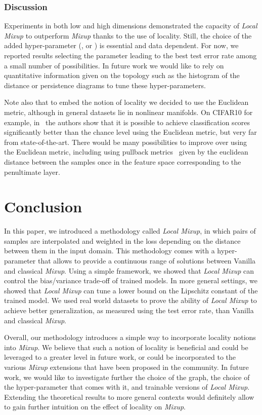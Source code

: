 \documentclass[twoside]{article}
\numberwithin{intassumption}{assumption}
\begin{document}
\subsubsection{Discussion}
Experiments in both low and high dimensions demonstrated the capacity of \emph{Local Mixup} to outperform \emph{Mixup} thanks to the use of locality. 
Still, the choice of the added hyper-parameter (,  or ) is essential and data dependent. For now, we reported results selecting the parameter leading to the best test error rate among a small number of possibilities. In future work we would like to rely on quantitative information given on the topology such as the histogram of the distance or persistence diagrams\citep{topologicaldatanalysis} to tune these hyper-parameters.

Note also that to embed the notion of locality we decided to use the Euclidean metric, although in general datasets lie in nonlinear manifolds. On CIFAR10 for example, in~\citep{KnearestMixup} the authors show that it is possible to achieve classification scores significantly better than the chance level using the Euclidean metric, but very far from state-of-the-art. There would be many possibilities to improve over using the Euclidean metric, including using pullback metrics~\citep{pullback,pullbacklatent} given by the euclidean distance between the samples once in the feature space corresponding to the penultimate layer.

\section{Conclusion}

In this paper, we introduced a methodology called \emph{Local Mixup}, in which pairs of samples are interpolated and weighted in the loss depending on the distance between them in the input domain.
This methodology comes with a hyper-parameter that allows to provide a continuous range of solutions between Vanilla and classical \emph{Mixup}.
Using a simple framework, we showed that \emph{Local Mixup} can control the bias/variance trade-off of trained models. In more general settings, we showed that \emph{Local Mixup} can tune a lower bound on the Lipschitz constant of the trained model.
We used real world datasets to prove the ability of \emph{Local Mixup} to achieve better generalization, as measured using the test error rate, than Vanilla and classical \emph{Mixup}.

Overall, our methodology introduces a simple way to incorporate locality notions into \emph{Mixup}. We believe that such a notion of locality is beneficial and could be leveraged to a greater level in future work, or could be incorporated to the various \emph{Mixup} extensions that have been proposed in the community.
In future work, we would like to investigate further the choice of the graph, the choice of the hyper-parameter that comes with it, and trainable versions of \emph{Local Mixup}. Extending the theoretical results to more general contexts would definitely allow to gain further intuition on the effect of locality on \emph{Mixup}.


\end{document}
